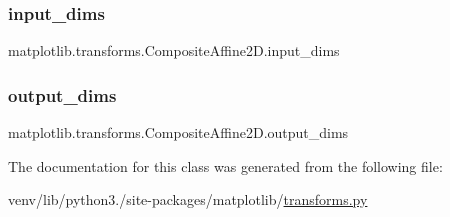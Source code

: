 \subsubsection{\texorpdfstring{input\+\_\+dims}{input\_dims}}
{\footnotesize\ttfamily matplotlib.\+transforms.\+Composite\+Affine2\+D.\+input\+\_\+dims}

\mbox{\label{classmatplotlib_1_1transforms_1_1CompositeAffine2D_a79a176338d6502885484c930173c67a8}} 
\subsubsection{\texorpdfstring{output\+\_\+dims}{output\_dims}}
{\footnotesize\ttfamily matplotlib.\+transforms.\+Composite\+Affine2\+D.\+output\+\_\+dims}



The documentation for this class was generated from the following file\+:\begin{DoxyCompactItemize}
\item 
venv/lib/python3./site-\/packages/matplotlib/\hyperlink{transforms_8py}{transforms.\+py}\end{DoxyCompactItemize}
